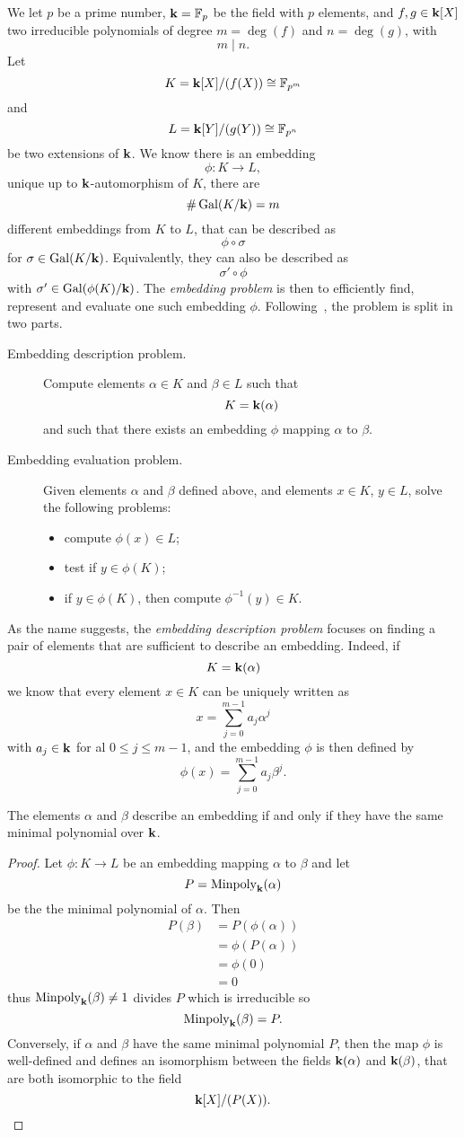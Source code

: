 We let $p$ be a prime number, $\mathbf{k} = \mathbb{F}_p$ be the field with $p$ elements,
and $f, g\in\mathbf{k}[X]$ two irreducible polynomials of degree $m=\deg(f)$ and
$n=\deg(g)$, with
\[
  m\mid n.
\]
Let
\[
  K=\mathbf{k}[X]/(f(X))\cong\mathbb{F}_{p^m}
\]
and
\[
  L = \mathbf{k}[Y]/(g(Y))\cong\mathbb{F}_{p^n}
\]
be two extensions of $\mathbf{k}$. We know there is an embedding
\[
  \phi:K\to L,
\]
unique up to $\mathbf{k}$-automorphism of $K$, \ie there are
\[
  \#\operatorname{Gal}(K/\mathbf{k})=m
\]
different embeddings from $K$ to $L$, that can be described as
\[
  \phi\circ\sigma
\]
for $\sigma\in\operatorname{Gal}(K/\mathbf{k})$. Equivalently, they can also be described as
\[
  \sigma'\circ\phi
\]
with $\sigma'\in\operatorname{Gal}(\phi(K)/\mathbf{k})$. The \emph{embedding problem} is then to
efficiently find, represent and evaluate one such embedding $\phi$. 
Following~\cite{BDDFS17}, the problem is split in two parts.
\begin{description}
  \item[Embedding description problem.] Compute elements $\alpha\in K$ and
    $\beta\in L$ such that 
    \[
      K=\mathbf{k}(\alpha)
    \]
    and such that there exists an embedding $\phi$ mapping $\alpha$ to $\beta$.
  \item[Embedding evaluation problem.] Given elements $\alpha$ and $\beta$
    defined above, and elements $x\in K$, $y\in L$, solve the
    following problems:
    \begin{itemize}
      \item compute $\phi(x)\in L$;
      \item test if $y\in\phi(K)$;
      \item if $y\in\phi(K)$, then compute $\phi^{-1}(y)\in K$.
    \end{itemize}
\end{description}
As the name suggests, the \emph{embedding description problem} focuses on
finding a pair of elements that are sufficient to describe an embedding. Indeed,
if 
\[
  K=\mathbf{k}(\alpha)
\]
we know that every element $x\in K$ can be uniquely written as 
\[
  x = \sum_{j=0}^{m-1}a_j\alpha^j
\]
with $a_j\in\mathbf{k}$ for al $0\leq j\leq m-1$, and the embedding $\phi$ is then
defined by
\[
  \phi(x) = \sum_{j=0}^{m-1}a_j\beta^j.
\]
\begin{prop}
  \label{prop:description}
 The elements $\alpha$ and $\beta$
 describe an embedding if and only if they have the same minimal polynomial over
 $\mathbf{k}$. 
\end{prop}
\begin{proof}
  Let $\phi:K\to L$ be an embedding mapping $\alpha$ to $\beta$ and let 
  \[
    P = \operatorname{Minpoly}_{\mathbf{k}}(\alpha)
  \]
  be the the minimal polynomial of $\alpha$. Then 
  \begin{align*}
    P(\beta) &= P(\phi(\alpha)) \\
    &= \phi(P(\alpha))\\
    &= \phi(0) \\
    &= 0
  \end{align*}
  thus $\operatorname{Minpoly}_{\mathbf{k}}(\beta)\neq 1$ divides $P$ which is irreducible so 
  \[
\operatorname{Minpoly}_{\mathbf{k}}(\beta) = P.
  \]
 Conversely, if $\alpha$ and $\beta$ have the same minimal polynomial $P$, then the
 map $\phi$ is well-defined and defines an isomorphism between the fields $\mathbf{k}(\alpha)$ and
 $\mathbf{k}(\beta)$, that are both isomorphic to the field
 \[
   \mathbf{k}[X]/(P(X)).
 \]
\end{proof}
